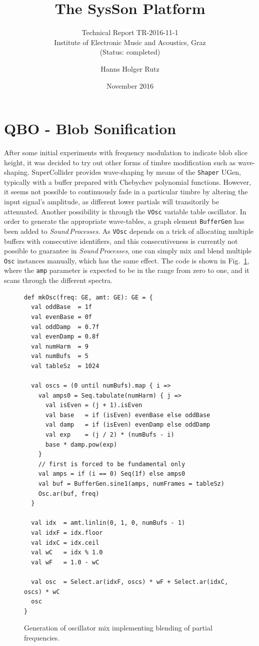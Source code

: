 \documentclass[11pt,a4paper]{article}
\title{The SysSon Platform}
\subtitle{Technical Report TR-2016-11-1\\Institute of Electronic Music and Acoustics, Graz\\(Status: completed)}
\author{Hanns Holger Rutz}
\date{November 2016}
\newcommand{\figref}[1]{Fig.~\ref{#1}}
\newcommand{\software}[1]{\textit{#1}}
\begin{document}
\maketitle
{}
\thispagestyle{empty}
\newpage
\section{QBO - Blob Sonification}

After some initial experiments with frequency modulation to indicate blob slice height, it was decided to try out other forms of timbre modification such as wave-shaping. SuperCollider provides wave-shaping by means of the \Verb!Shaper! UGen, typically with a buffer prepared with Chebychev polynomial functions. However, it seems not possible to continuously fade in a particular timbre by altering the input signal's amplitude, as different lower partials will transitorily be attenuated. Another possibility is through the \Verb!VOsc! variable table oscillator. In order to generate the appropriate wave-tables, a graph element \Verb!BufferGen! has been added to \software{Sound\,Processes}. As \Verb!VOsc! depends on a trick of allocating multiple buffers with consecutive identifiers, and this consecutiveness is currently not possible to guarantee in \software{Sound\,Processes}, one can simply mix and blend multiple \Verb!Osc! instances manually, which has the same effect. The code is shown in \figref{fig:wave-shaping-mk-osc}, where the \Verb!amp! parameter is expected to be in the range from zero to one, and it scans through the different spectra.

\begin{figure}[b]
\begin{lstlisting}[style=scala]
def mkOsc(freq: GE, amt: GE): GE = {
  val oddBase  = 1f
  val evenBase = 0f
  val oddDamp  = 0.7f
  val evenDamp = 0.8f
  val numHarm  = 9
  val numBufs  = 5
  val tableSz  = 1024
  
  val oscs = (0 until numBufs).map { i =>
    val amps0 = Seq.tabulate(numHarm) { j =>
      val isEven = (j + 1).isEven
      val base   = if (isEven) evenBase else oddBase
      val damp   = if (isEven) evenDamp else oddDamp
      val exp    = (j / 2) * (numBufs - i)
      base * damp.pow(exp)
    }
    // first is forced to be fundamental only
    val amps = if (i == 0) Seq(1f) else amps0
    val buf = BufferGen.sine1(amps, numFrames = tableSz)
    Osc.ar(buf, freq)
  }
  
  val idx  = amt.linlin(0, 1, 0, numBufs - 1)
  val idxF = idx.floor
  val idxC = idx.ceil
  val wC   = idx % 1.0
  val wF   = 1.0 - wC
  
  val osc  = Select.ar(idxF, oscs) * wF + Select.ar(idxC, oscs) * wC
  osc
}
\end{lstlisting}
\caption{Generation of oscillator mix implementing blending of partial frequencies.}
\label{fig:wave-shaping-mk-osc}
\end{figure}
\end{document}

